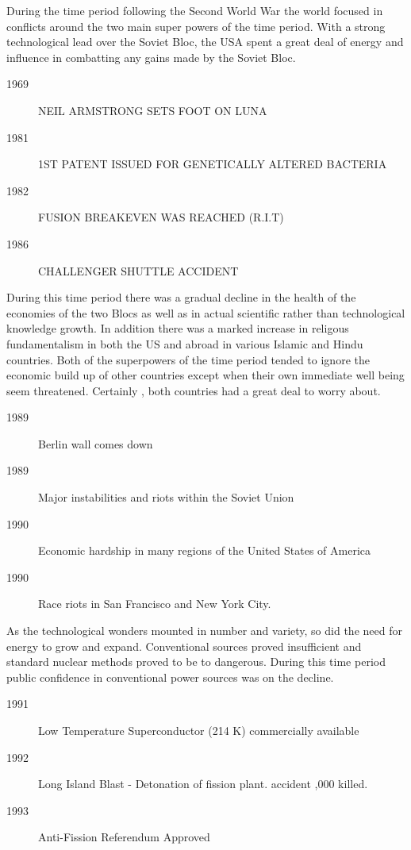 During the time period following the Second World War the world focused
in conflicts around the two main super powers of the time period. With
a strong technological lead over the Soviet Bloc, the USA spent a great
deal of energy and influence in combatting any gains made by the Soviet
Bloc. 

\begin{description}
	\item[1969]   NEIL ARMSTRONG SETS FOOT ON LUNA
	\item[1981]   1ST PATENT ISSUED FOR GENETICALLY ALTERED BACTERIA
	\item[1982]   FUSION BREAKEVEN WAS REACHED (R.I.T)
	\item[1986]   CHALLENGER SHUTTLE ACCIDENT
\end{description}

During this time period there was a gradual decline in the health of
the economies of the two Blocs as well as in actual scientific rather
than technological knowledge growth. In addition there was a marked
increase in religous fundamentalism in both the US and abroad in
various Islamic and Hindu countries. Both of the superpowers of the 
time period tended to ignore the economic build up of other countries 
except when their own immediate well being seem threatened. Certainly 
, both countries had a great deal to worry about.
\begin{description}
	\item[1989]	Berlin wall comes down
	\item[1989]	Major instabilities and riots within the Soviet Union
	\item[1990]	Economic hardship in many regions of the United States of 
		America
	\item[1990]	Race riots in San Francisco and New York City.
\end{description}

As the technological wonders mounted in number and variety, so did the
need for energy to grow and expand. Conventional sources proved
insufficient and standard nuclear methods proved to be to dangerous.
During this time period public confidence in conventional
power sources was on the decline. 

\begin{description}
	\item[1991]	Low Temperature Superconductor (214 K) commercially 
		available
	\item[1992]	Long Island Blast - Detonation of fission plant.
		accident ,000 killed.
	\item[1993]	Anti-Fission Referendum Approved
\end{description}

